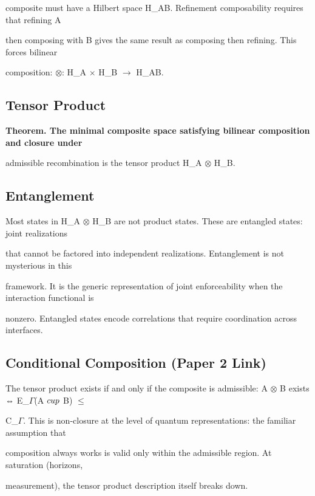 \documentclass[11pt]{article}
\begin{document}
composite must have a Hilbert space H_AB. Refinement composability requires that refining A

then composing with B gives the same result as composing then refining. This forces bilinear

composition: $\otimes$: H_A $\times$ H_B $\to$ H_AB.



\subsection{Tensor Product}

\textbf{Theorem. The minimal composite space satisfying bilinear composition and closure under}

admissible recombination is the tensor product H_A $\otimes$ H_B.



\subsection{Entanglement}

Most states in H_A $\otimes$ H_B are not product states. These are entangled states: joint realizations

that cannot be factored into independent realizations. Entanglement is not mysterious in this

framework. It is the generic representation of joint enforceability when the interaction functional is

nonzero. Entangled states encode correlations that require coordination across interfaces.



\subsection{Conditional Composition (Paper 2 Link)}

The tensor product exists if and only if the composite is admissible: A $\otimes$ B exists ⇔ E_$\Gamma$(A $\\cup$ B) $\leq$

C_$\Gamma$. This is non-closure at the level of quantum representations: the familiar assumption that

composition always works is valid only within the admissible region. At saturation (horizons,

measurement), the tensor product description itself breaks down.
\end{document}
